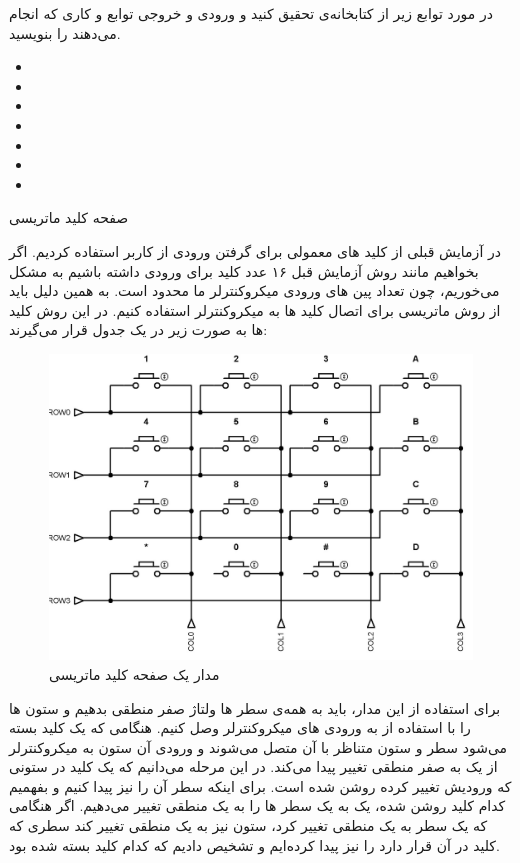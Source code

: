 \newline
در مورد توابع زیر از کتابخانه‌ی  تحقیق کنید و ورودی و خروجی توابع و کاری که انجام می‌دهند را بنویسید.
\begin{itemize}
    \item {}
    \item {}
    \item {}
    \item {}
    \item {}
    \item {}
    \item {}
\end{itemize}

\pagebreak
\begin{nas}صفحه کلید ماتریسی\end{nas}
\newline
در آزمایش قبلی از کلید های معمولی برای گرفتن ورودی از کاربر استفاده کردیم. اگر بخواهیم مانند روش آزمایش قبل ۱۶ عدد کلید برای ورودی داشته باشیم به مشکل می‌خوریم، چون تعداد پین های ورودی میکروکنترلر ما محدود است. به همین دلیل باید از روش ماتریسی برای اتصال کلید ها به میکروکنترلر استفاده کنیم.
\newline
در این روش کلید ها به صورت زیر در یک جدول قرار می‌گیرند:
\newline
\begin{figure}[h]
    \centering
    \includegraphics[width=16cm]{keypad-circ.png}
    \caption{مدار یک صفحه کلید ماتریسی}
    \label{fig:keypad-circ}
\end{figure}
\newline
برای استفاده از این مدار، باید به همه‌ی سطر ها ولتاژ صفر منطقی بدهیم و ستون ها را با استفاده از
 به ورودی های میکروکنترلر وصل کنیم.
هنگامی که یک کلید بسته می‌شود سطر و ستون متناظر با آن متصل می‌شوند و ورودی آن ستون به میکروکنترلر از یک به صفر منطقی تغییر پیدا می‌کند. در این مرحله می‌دانیم که یک کلید در ستونی که ورودیش تغییر کرده روشن شده است. برای اینکه سطر آن را نیز پیدا کنیم و بفهمیم کدام کلید روشن شده، یک به یک سطر ها را به یک منطقی تغییر می‌دهیم. اگر هنگامی که یک سطر به یک منطقی تغییر کرد، ستون نیز به یک منطقی تغییر کند سطری که کلید در آن قرار دارد را نیز پیدا کرده‌ایم و تشخیص دادیم که کدام کلید بسته شده بود.

